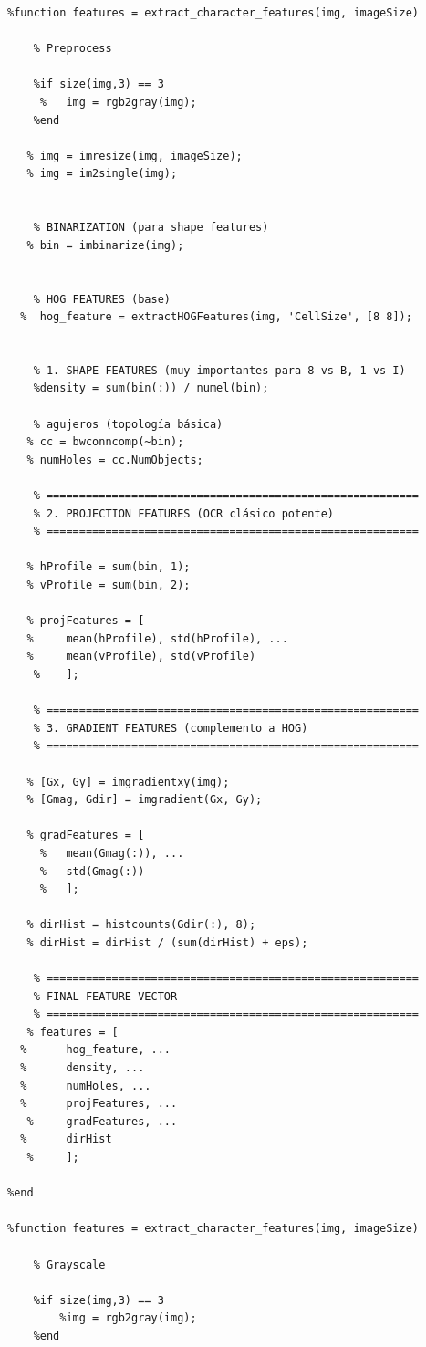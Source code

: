 \begin{verbatim}
%function features = extract_character_features(img, imageSize)

    % Preprocess
 
    %if size(img,3) == 3
     %   img = rgb2gray(img);
    %end
    
   % img = imresize(img, imageSize);
   % img = im2single(img);
    
  
    % BINARIZATION (para shape features)
   % bin = imbinarize(img);
    
  
    % HOG FEATURES (base)
  %  hog_feature = extractHOGFeatures(img, 'CellSize', [8 8]);
    
 
    % 1. SHAPE FEATURES (muy importantes para 8 vs B, 1 vs I)
    %density = sum(bin(:)) / numel(bin);
    
    % agujeros (topología básica)
   % cc = bwconncomp(~bin);
   % numHoles = cc.NumObjects;
    
    % =========================================================
    % 2. PROJECTION FEATURES (OCR clásico potente)
    % =========================================================
    
   % hProfile = sum(bin, 1);
   % vProfile = sum(bin, 2);
    
   % projFeatures = [
   %     mean(hProfile), std(hProfile), ...
   %     mean(vProfile), std(vProfile)
    %    ];
    
    % =========================================================
    % 3. GRADIENT FEATURES (complemento a HOG)
    % =========================================================
    
   % [Gx, Gy] = imgradientxy(img);
   % [Gmag, Gdir] = imgradient(Gx, Gy);
    
   % gradFeatures = [
     %   mean(Gmag(:)), ...
     %   std(Gmag(:))
     %   ];
    
   % dirHist = histcounts(Gdir(:), 8);
   % dirHist = dirHist / (sum(dirHist) + eps);
    
    % =========================================================
    % FINAL FEATURE VECTOR
    % =========================================================
   % features = [
  %      hog_feature, ...
  %      density, ...
  %      numHoles, ...
  %      projFeatures, ...
   %     gradFeatures, ...
  %      dirHist
   %     ];

%end

%function features = extract_character_features(img, imageSize)

    % Grayscale
    
    %if size(img,3) == 3
        %img = rgb2gray(img);
    %end
    

\end{verbatim}
